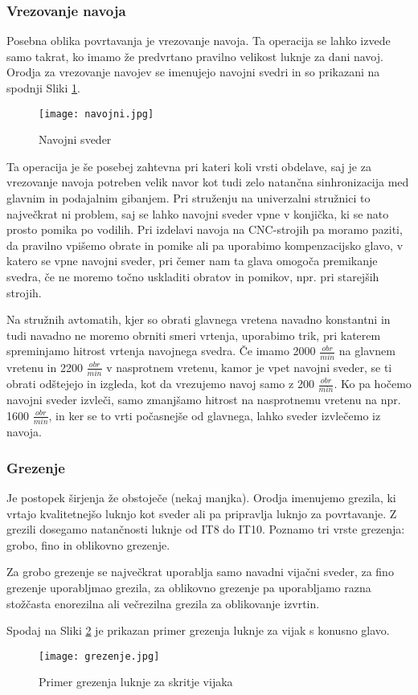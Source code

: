 \subsubsection{Vrezovanje navoja}
Posebna oblika povrtavanja je vrezovanje navoja. Ta operacija se
lahko izvede samo takrat, ko imamo že predvrtano pravilno
velikost luknje za dani navoj. Orodja za vrezovanje navojev se
imenujejo navojni svedri in so prikazani na spodnji Sliki \ref{navojni_sveder}.
\begin{figure}[H]
	\begin{center}
		\texttt{[image: navojni.jpg]}
		\caption{Navojni sveder
			\cite{sts_arhiv}}
		\label{navojni_sveder}
	\end{center}
\end{figure}
Ta operacija je še posebej zahtevna pri kateri koli vrsti obdelave,
saj je za vrezovanje navoja potreben velik navor kot tudi zelo natančna
sinhronizacija med glavnim in podajalnim gibanjem. Pri struženju
na univerzalni stružnici to največkrat ni problem, saj se lahko navojni
sveder vpne v konjička, ki se nato prosto pomika po vodilih.
Pri izdelavi navoja na CNC-strojih pa moramo paziti, da pravilno vpišemo
obrate in pomike ali pa uporabimo kompenzacijsko glavo, v katero se
vpne navojni sveder, pri čemer nam ta glava omogoča premikanje svedra, če
ne moremo točno uskladiti obratov in pomikov, npr. pri starejših
strojih.

Na stružnih avtomatih, kjer so obrati glavnega vretena navadno konstantni
in tudi navadno ne moremo obrniti smeri vrtenja, uporabimo trik, pri katerem
spreminjamo hitrost vrtenja navojnega svedra. Če imamo 2000 \(\frac{obr}{min}\)
na glavnem vretenu in 2200 \(\frac{obr}{min}\) v nasprotnem vretenu, kamor je
vpet navojni sveder, se ti obrati odštejejo in izgleda, kot da vrezujemo
navoj samo z 200 \(\frac{obr}{min}\). Ko pa hočemo navojni sveder izvleči, samo
zmanjšamo hitrost na nasprotnemu vretenu na npr. 1600 \(\frac{obr}{min}\),
in ker se to vrti počasnejše od glavnega, lahko sveder izvlečemo iz navoja.

\subsubsection{Grezenje}
Je postopek širjenja že obstoječe (nekaj manjka). Orodja imenujemo grezila,
ki vrtajo kvalitetnejšo luknjo kot sveder ali pa pripravlja
luknjo za povrtavanje. Z grezili dosegamo natančnosti luknje od
IT8 do IT10. Poznamo tri vrste grezenja: grobo, fino in oblikovno grezenje.

Za grobo grezenje se največkrat uporablja samo navadni vijačni
sveder, za fino grezenje uporabljmao grezila, za oblikovno grezenje
pa uporabljamo razna stožčasta enorezilna ali večrezilna grezila
za oblikovanje izvrtin.

Spodaj na Sliki \ref{grezilo} je prikazan primer grezenja
luknje za vijak s konusno glavo.

\begin{figure}[H]
	\begin{center}
		\texttt{[image: grezenje.jpg]}
		\caption{Primer grezenja luknje za skritje vijaka
			\cite{sts_arhiv_grezenje}}
		\label{grezilo}
	\end{center}
\end{figure}